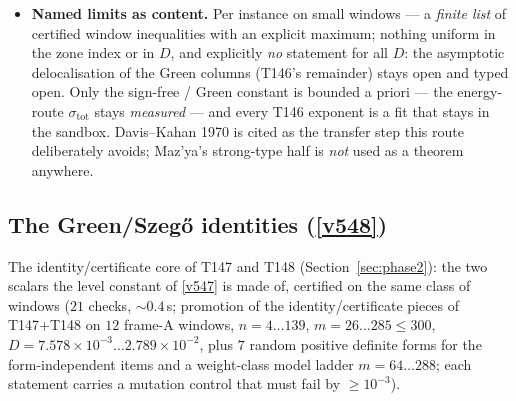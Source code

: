 \documentclass[11pt,a4paper]{article}
\begin{document}
\begin{itemize}[leftmargin=1.5em]
$c_0^{\mathrm{ap}}=2b^2\,\Gamma\min(1,\Gamma_1)+\varepsilon=3.9042$--$4.8488$ dominates the
measured level constant on all $12$ windows (slack $1.986$--$2.418$) and stays under the
preregistered ceiling $16=4\times$ Maz'ya's Dirichlet value $4$; the certified window
inequality $\mathrm{cert\_lam\_max}(R)\le c_0^{\mathrm{ap}}\Psi_{\mathrm{abs}}$ holds on
$12/12$ (both sides by completed Cholesky, the density the $|R|$ one with Charikar's cited
constant), closing the chain at loss factor $0.0423$--$0.1272$ of the exact gap ---
\vref{v546}'s certified chain with its one measured input replaced by a functional of the
form. \emph{The built-in discriminator}: on T145's no-go form $R=aa^{\mathsf T}+\varepsilon I$,
$a_i=i^{-1/2}$, $\Gamma$ grows $3.676\to6.798$ over $m=64\ldots288$ (ratio $1.85\ge$ the
preregistered $1.5$) and $c_0^{\mathrm{ap}}=11.10$ \emph{exceeds} every window value --- the
bound must be worse there, since a candidate that did not fail on the no-go would prove a
false statement --- while the theorem half survives on every no-go size and the Dirichlet
path-Laplacian control stays flat (max/min $1.0063$). Control: $c_0^{\mathrm{ap}}\times
10^{-3}$ breaks the certificate on every window.
\item \textbf{Named limits as content.} Per instance on small windows --- a \emph{finite list}
of certified window inequalities with an explicit maximum; nothing uniform in the zone index
or in $D$, and explicitly \emph{no} statement for all $D$: the asymptotic delocalisation of
the Green columns (T146's remainder) stays open and typed open. Only the sign-free / Green
constant is bounded a priori --- the energy-route $\sigma_{\mathrm{tot}}$ stays
\emph{measured} --- and every T146 exponent is a fit that stays in the sandbox. Davis--Kahan
1970 is cited as the transfer step this route deliberately avoids; Maz'ya's strong-type half
is \emph{not} used as a theorem anywhere.
\end{itemize}

\subsection{The Green/Szeg\H{o} identities (\texorpdfstring{\vref{v548}}{v548})}\label{sec:v548}
The identity/certificate core of T147 and T148 (Section~\ref{sec:phase2}): the two scalars the
level constant of \vref{v547} is made of, certified on the same class of windows
 ($21$ checks, ${\sim}0.4$\,s; promotion of the
identity/certificate pieces of T147+T148 on $12$ frame-A windows, $n=4\ldots139$,
$m=26\ldots285\le300$, $D=7.578\times10^{-3}\ldots2.789\times10^{-2}$, plus $7$ random positive
definite forms for the form-independent items and a weight-class model ladder $m=64\ldots288$;
each statement carries a mutation control that must fail by $\ge10^{-3}$).
\end{document}
